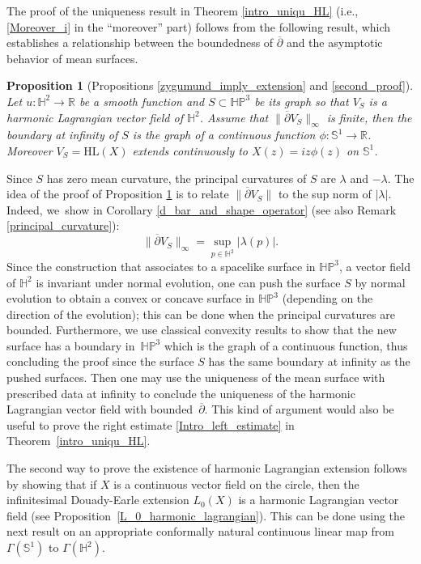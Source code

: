 \documentclass[11pt]{article}
\newcommand{\ie}{i.e.,\xspace}
\theoremstyle{plain}
\newtheorem{prop}[cor]{Proposition}
\theoremstyle{definition}
\newcommand{\HP}{\mathbb{HP}^3}
\begin{document}
The proof of the uniqueness result in Theorem \ref{intro_uniqu_HL} (\ie \eqref{Moreover_i}  in the ``moreover'' part) follows from the following result, which establishes a relationship between the boundedness of \(\overline{\partial} \) and the asymptotic behavior of mean surfaces.

\begin{prop}[Propositions \ref{zygumund_imply_extension} and \ref{second_proof}]\label{intro_pro_bounded_imple_extension}
Let \(u: \mathbb{H}^2 \to \mathbb{R} \) be a smooth function and \(S \subset \HP \) be its graph so that \(V_S \) is a harmonic Lagrangian vector field of \(\mathbb{H}^2\). Assume that \(\lVert \overline{\partial} V_S \rVert_{\infty}\) is finite, then the boundary at infinity of \(S \) is the graph of a continuous function \(\phi: \mathbb{S}^1 \to \mathbb{R}\). Moreover $V_S=\mathrm{HL}(X)$ extends continuously to $X(z)=iz\phi(z)$ on $\mathbb{S}^1$.
\end{prop}

Since \(S \) has zero mean curvature, the principal curvatures of \(S \) are \(\lambda\) and \(-\lambda\). The idea of the proof of Proposition \ref{intro_pro_bounded_imple_extension} is to relate \(\lVert \overline{\partial} V_S \rVert\) to the sup norm of \(\lvert \lambda \rvert\). Indeed, we~show in Corollary \ref{d_bar_and_shape_operator} (see also Remark \ref{principal_curvature}):
\[
\lVert \overline{\partial} V_S \rVert_{\infty} = \sup_{p \in \mathbb{H}^2} \lvert \lambda(p) \rvert.
\]
Since the construction that associates to a spacelike surface in \(\HP\), a vector field of \(\mathbb{H}^2\) is invariant under normal evolution, one can push the surface \(S \) by normal evolution to obtain a convex or concave surface in \(\HP\) (depending on the direction of the evolution); this can be done when the principal curvatures are bounded. Furthermore, we use classical convexity results to show that the new surface has a boundary in~\(\HP\) which is the graph of a continuous function, thus concluding the proof since the surface \(S \) has the same boundary at infinity as the pushed surfaces. Then one may use the uniqueness of the mean surface with prescribed data at infinity to conclude the uniqueness of the harmonic Lagrangian vector field with bounded~\(\overline{\partial}\). This kind of argument would also be useful to prove the right estimate \eqref{Intro_left_estimate} in Theorem~\ref{intro_uniqu_HL}.

The second way to prove the existence of harmonic Lagrangian extension follows by showing that if \(X \) is a continuous vector field on the circle, then the infinitesimal Douady-Earle extension \(L_0(X) \) is a harmonic Lagrangian vector field (see Proposition~\ref{L_0_harmonic_lagrangian}). This can be done using the next result on an appropriate conformally natural continuous linear map from \(\Gamma(\mathbb{S}^1)\) to \(\Gamma(\mathbb{H}^2)\).
\end{document}
